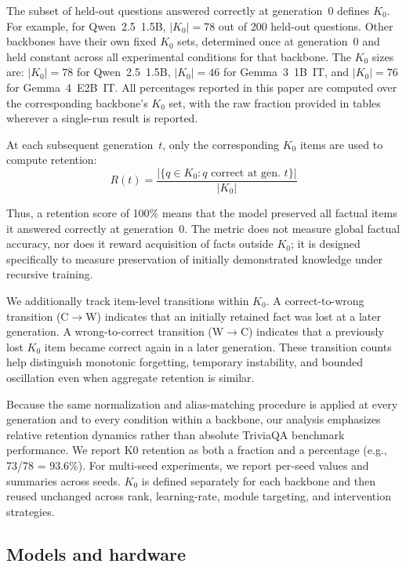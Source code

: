 \documentclass[a4paper,fleqn]{cas-dc}
\newif\ifshowchanges
\newcommand{\rev}[1]{\ifshowchanges{\color{blue}#1}\else{#1}\fi}
\begin{document}
The subset of held-out questions answered correctly at generation~0 defines
$K_0$. For example, for Qwen~2.5~1.5B, $|K_0|=78$ out of 200 held-out
questions. Other backbones have their own fixed $K_0$ sets, determined once at
generation~0 and held constant across all experimental conditions for that
backbone.
The $K_0$ sizes are: $|K_0|=78$ for Qwen~2.5~1.5B, $|K_0|=46$ for
Gemma~3~1B~IT, and $|K_0|=76$ for Gemma~4~E2B~IT. All percentages reported
in this paper are computed over the corresponding backbone's $K_0$ set, with
the raw fraction provided in tables wherever a single-run result is reported.

At each subsequent generation~$t$, only the corresponding $K_0$ items are used
to compute retention:
\begin{equation}\label{eq:k0}
  \rev{R(t)} =
  \frac{|\{q \in K_0 : q \text{ correct at gen.\ } t\}|}{|K_0|}
\end{equation}

Thus, a retention score of 100\% means that the model preserved all factual
items it answered correctly at generation~0. The metric does not measure global
factual accuracy, nor does it reward acquisition of facts outside $K_0$; it is
designed specifically to measure preservation of initially demonstrated
knowledge under recursive training.

We additionally track item-level transitions within $K_0$. A
correct-to-wrong transition (C$\to$W) indicates that an initially retained fact
was lost at a later generation. A wrong-to-correct transition (W$\to$C)
indicates that a previously lost $K_0$ item became correct again in a later
generation. These transition counts help distinguish monotonic forgetting,
temporary instability, and bounded oscillation even when aggregate retention is
similar.

Because the same normalization and alias-matching procedure is applied at every
generation and to every condition within a backbone, our analysis emphasizes
relative retention dynamics rather than absolute TriviaQA benchmark performance.
We report K0 retention as both a fraction and a percentage (e.g.,
73/78 = 93.6\%). For multi-seed experiments, we report per-seed values and
summaries across seeds. $K_0$ is defined separately
for each backbone and then reused unchanged across rank, learning-rate, module
targeting, and intervention strategies.

\subsection{Models and hardware}\label{sec:models}
\end{document}
